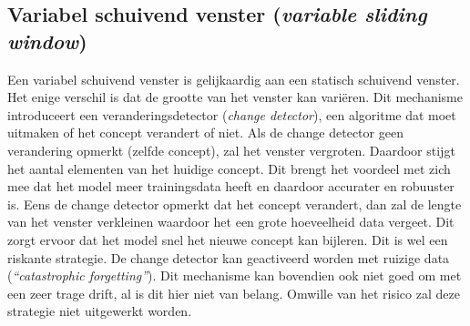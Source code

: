 \subsection{Variabel schuivend venster (\textit{variable sliding window})}
Een variabel schuivend venster is gelijkaardig aan een statisch schuivend venster. Het enige verschil is dat de grootte van het venster kan variëren. Dit mechanisme introduceert een veranderingsdetector (\textit{change detector}), een algoritme dat moet uitmaken of het concept verandert of niet. Als de change detector geen verandering opmerkt (zelfde concept), zal het venster vergroten. Daardoor stijgt het aantal elementen van het huidige concept. Dit brengt het voordeel met zich mee dat het model meer trainingsdata heeft en daardoor accurater en robuuster is. Eens de change detector opmerkt dat het concept verandert, dan zal de lengte van het venster verkleinen waardoor het een grote hoeveelheid data vergeet. Dit zorgt ervoor dat het model snel het nieuwe concept kan bijleren. Dit is wel een riskante strategie. De change detector kan geactiveerd worden met ruizige data (\textit{“catastrophic forgetting”}). Dit mechanisme kan bovendien ook niet goed om met een zeer trage drift, al is dit hier niet van belang. Omwille van het risico zal deze strategie niet uitgewerkt worden.

